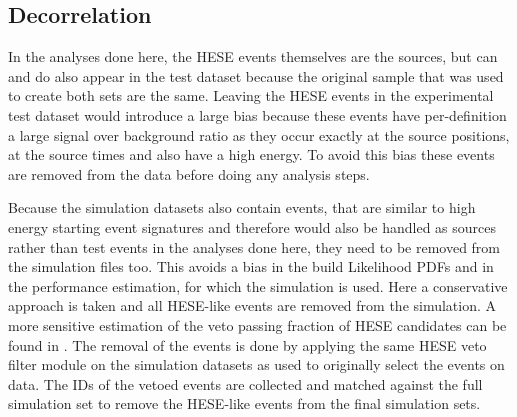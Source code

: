 \subsection{Decorrelation}
In the analyses done here, the HESE events themselves are the sources, but can and do also appear in the test dataset because the original sample that was used to create both sets are the same.
Leaving the HESE events in the experimental test dataset would introduce a large bias because these events have per-definition a large signal over background ratio as they occur exactly at the source positions, at the source times and also have a high energy.
To avoid this bias these events are removed from the data before doing any analysis steps.

Because the simulation datasets also contain events, that are similar to high energy starting event signatures and therefore would also be handled as sources rather than test events in the analyses done here, they need to be removed from the simulation files too.
This avoids a bias in the build Likelihood PDFs and in the performance estimation, for which the simulation is used.
Here a conservative approach is taken and all HESE-like events are removed from the simulation.
A more sensitive estimation of the veto passing fraction of HESE candidates can be found in \cite{Arguelles:2018awr}.
The removal of the events is done by applying the same HESE veto filter module on the simulation datasets as used to originally select the events on data.
The IDs of the vetoed events are collected and matched against the full simulation set to remove the HESE-like events from the final simulation sets.
